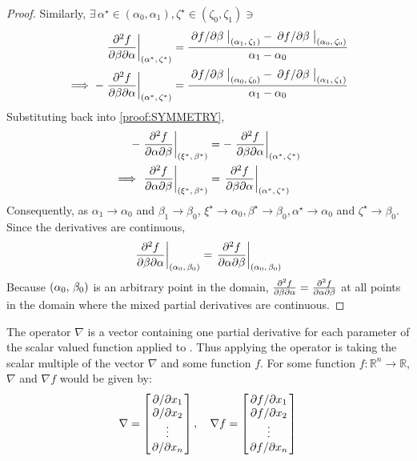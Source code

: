 \begin{lemma}
\begin{proof}
		Similarly, $\exists\,\alpha^\star\in(\alpha_0,\alpha_1),\zeta^\star\in(\zeta_0,\zeta_1)\ni$
		\begin{align*}
			\eval{\pdv{f}{\beta}{\alpha}}_{\point{\alpha^\star}{\zeta^\star}}&=\frac{\eval{\pdv*{f}{\beta}}_{\point{\alpha_1}{\zeta_1}}-\eval{\pdv*{f}{\beta}}_{\point{\alpha_0}{\zeta_0}}}{\alpha_1-\alpha_0}\\
			\implies-\eval{\pdv{f}{\beta}{\alpha}}_{\point{\alpha^\star}{\zeta^\star}}&=\frac{\eval{\pdv*{f}{\beta}}_{\point{\alpha_0}{\zeta_0}}-\eval{\pdv*{f}{\beta}}_{\point{\alpha_1}{\zeta_1}}}{\alpha_1-\alpha_0}
		\end{align*}
		Substituting back into \eqref{proof:SYMMETRY},
		\begin{align*}
			-\eval{\pdv{f}{\alpha}{\beta}}_{\point{\xi^\star}{\beta^\star}}&=-\eval{\pdv{f}{\beta}{\alpha}}_{\point{\alpha^\star}{\zeta^\star}}\\
			\implies\eval{\pdv{f}{\alpha}{\beta}}_{\point{\xi^\star}{\beta^\star}}&=\eval{\pdv{f}{\beta}{\alpha}}_{\point{\alpha^\star}{\zeta^\star}}
		\end{align*}
		Consequently, as $\alpha_1\rightarrow\alpha_0$ and $\beta_1\rightarrow\beta_0$, $\xi^\star\rightarrow\alpha_0,\beta^\star\rightarrow\beta_0,\alpha^\star\rightarrow\alpha_0$ 
		and $\zeta^\star\rightarrow\beta_0$. Since the derivatives are continuous,
		$$
			\eval{\pdv{f}{\beta}{\alpha}}_{\point{\alpha_0}{\beta_0}}=\eval{\pdv{f}{\alpha}{\beta}}_{\point{\alpha_0}{\beta_0}}
		$$
		Because $\left(\alpha_0,\,\beta_0\right)$ is an arbitrary point in the domain, $\pdv{f}{\beta}{\alpha}=\pdv{f}{\alpha}{\beta}$ at 
		all points in the domain where the mixed partial derivatives are continuous.
	\end{proof}
\end{lemma}
\begin{defn}
	The  operator $\nabla$ is a vector containing one partial derivative for each parameter of
	the scalar valued function applied to \cite{RAPP2017137}. Thus applying the operator is taking the scalar multiple of the vector 
	$\nabla$ and some function $f$. For some function $f:\mathbb{R}^n\rightarrow\mathbb{R}$, $\nabla$ and $\nabla f$
	would be given by:
	$$
	\nabla=\begin{bmatrix}
		\pdv*{x_1}\\
		\pdv*{x_2}\\
		\vdots\\
		\pdv*{x_n}
	\end{bmatrix},\quad
	\nabla f=\begin{bmatrix}
		\pdv*{f}{x_1}\\
		\pdv*{f}{x_2}\\
		\vdots\\
		\pdv*{f}{x_n}
	\end{bmatrix}
	$$
\end{defn}
